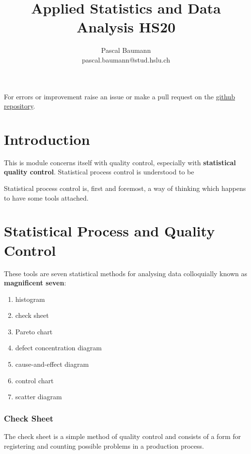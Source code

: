 \documentclass[11pt]{article}
\theoremstyle{definition}
\begin{document}
	
\title{Applied Statistics and Data Analysis HS20}
\author{Pascal Baumann\\pascal.baumann@stud.hslu.ch}
\maketitle



For errors or improvement raise an issue or make a pull request on the \href{https://github.com/KilnOfTheSecondFlame/mse_summaries}{github repository}.

\tableofcontents
\newpage

\section{Introduction}
This is module concerns itself with quality control, especially with \textbf{statistical quality control}. Statistical process control is understood to be

\begin{definition}
	Statistical process control is, first and foremost, a way of thinking which happens to have some tools attached.
\end{definition}

\section{Statistical Process and Quality Control}
These tools are seven statistical methods for analysing data colloquially known as \textbf{magnificent seven}:
\begin{enumerate}[noitemsep]
	\item histogram
	\item check sheet
	\item Pareto chart
	\item defect concentration diagram
	\item cause-and-effect diagram
	\item control chart
	\item scatter diagram
\end{enumerate}

\subsubsection{Check Sheet}
The check sheet is a simple method of quality control and consists of a form for  registering and counting possible problems in a production process.
\end{document}
